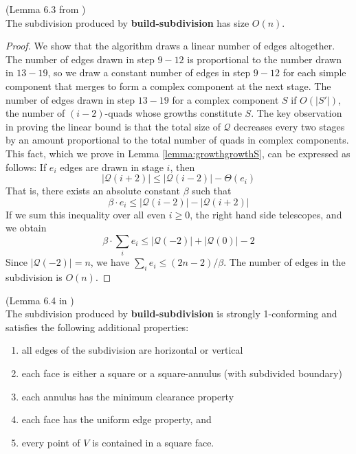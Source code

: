 \begin{Lemma}(Lemma 6.3 from \cite{HershbergerS99}) \label{lemma:6.3HershbergerS99}\\
The subdivision produced by \textbf{build-subdivision} has size $O(n)$.
\end{Lemma}

\begin{proof}
We show that the algorithm draws a linear number of edges altogether. The number of edges drawn in step $9-12$ is proportional to the number drawn in $13-19$, so we draw a constant number of edges in step $9-12$ for each simple component that merges to form a complex component at the next stage. The number of edges drawn in step $13-19$ for a complex component $S$ if $O(|S'|)$, the number of $(i-2)$-quads whose growths constitute $S$. The key observation in proving the linear bound is that the total size of $\mathcal{Q}$ decreases every two stages by an amount proportional to the total number of quads in complex components. This fact, which we prove in Lemma \ref{lemma:growthgrowthS}, can be expressed as follows: If $e_i$ edges are drawn in stage $i$, then
$$|\mathcal{Q}(i+2)| \leq |\mathcal{Q}(i-2)| - \Theta(e_i)$$
That is, there exists an absolute constant $\beta$ such that
$$\beta\cdot e_i \leq |\mathcal{Q}(i-2)|-|\mathcal{Q}(i+2)|$$
If we sum this inequality over all even $i \geq 0$, the right hand side telescopes, and we obtain 
$$\beta \cdot \sum_i e_i \leq |\mathcal{Q}(-2)| + |\mathcal{Q}(0)| - 2$$
Since $|\mathcal{Q}(-2)|=n$, we have $\sum_i e_i \leq (2n-2)/\beta$. The number of edges in the subdivision is $O(n)$.
\end{proof}

\begin{Lemma} (Lemma 6.4 in \cite{HershbergerS99}) \label{lemma:6.4HershbergerS99}\\ 
The subdivision produced by \textbf{build-subdivision} is strongly 1-conforming and satisfies the following additional properties:
\begin{enumerate}
	\item all edges of the subdivision are horizontal or vertical
    \item each face is either a square or a square-annulus (with subdivided boundary)
    \item each annulus has the minimum clearance property
    \item each face has the uniform edge property, and
    \item every point of $V$ is contained in a square face.
\end{enumerate}
\end{Lemma}

